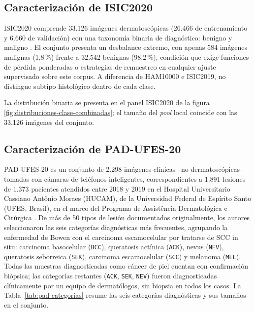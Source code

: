 \subsection{Caracterización de ISIC2020}

ISIC2020 comprende 33.126 imágenes dermatoscópicas (26.466 de entrenamiento y 6.660 de validación) con una taxonomía binaria de diagnóstico: benigno y maligno \parencite{rotemberg2021isic2020}. El conjunto presenta un desbalance extremo, con apenas 584 imágenes malignas (1,8\,\%) frente a 32.542 benignas (98,2\,\%), condición que exige funciones de pérdida ponderadas o estrategias de remuestreo en cualquier ajuste supervisado sobre este corpus. A diferencia de HAM10000 e ISIC2019, no distingue subtipo histológico dentro de cada clase.

La distribución binaria se presenta en el panel ISIC2020 de la figura \ref{fig:distribuciones-clase-combinadas}; el tamaño del \textit{pool} local coincide con las 33.126 imágenes del conjunto.


\subsection{Caracterización de PAD-UFES-20}

PAD-UFES-20 es un conjunto de 2.298 imágenes clínicas --no dermatoscópicas-- tomadas con cámaras de teléfonos inteligentes, correspondientes a 1.891 lesiones de 1.373 pacientes atendidos entre 2018 y 2019 en el Hospital Universitario Cassiano Antônio Moraes (HUCAM), de la Universidad Federal de Espírito Santo (UFES, Brasil), en el marco del Programa de Assistência Dermatológica e Cirúrgica \parencite{pacheco2020padufes}. De más de 50 tipos de lesión documentados originalmente, los autores seleccionaron las seis categorías diagnósticas más frecuentes, agrupando la enfermedad de Bowen con el carcinoma escamocelular por tratarse de SCC in situ: carcinoma basocelular (\texttt{BCC}), queratosis actínica (\texttt{ACK}), nevus (\texttt{NEV}), queratosis seborreica (\texttt{SEK}), carcinoma escamocelular (\texttt{SCC}) y melanoma (\texttt{MEL}). Todas las muestras diagnosticadas como cáncer de piel cuentan con confirmación biópsica; las categorías restantes (\texttt{ACK}, \texttt{SEK}, \texttt{NEV}) fueron diagnosticadas clínicamente por un equipo de dermatólogos, sin biopsia en todos los casos. La Tabla~\ref{tab:pad-categorias} resume las seis categorías diagnósticas y sus tamaños en el conjunto.

